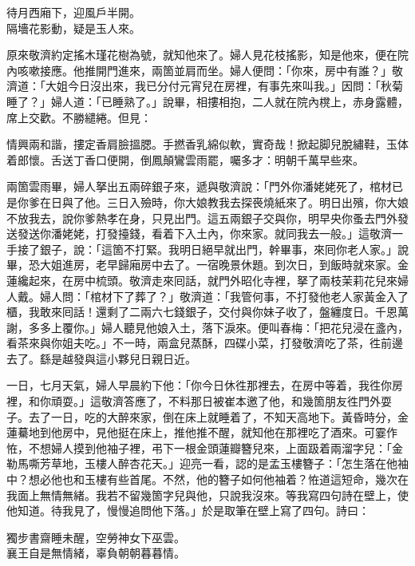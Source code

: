 \begin{myquote}
待月西廂下，迎風戶半開。\\隔墻花影動，疑是玉人來。
\end{myquote}

原來敬濟約定搖木瑾花樹為號，就知他來了。婦人見花枝搖影，知是他來，便在院內咳嗽接應。他推開門進來，兩箇並肩而坐。婦人便問：「你來，房中有誰？」敬濟道：「大姐今日沒出來，我已分付元宵兒在房裡，有事先來叫我。」因問：「秋菊睡了？」婦人道：「已睡熟了。」說畢，相摟相抱，二人就在院內櫈上，赤身露體，席上交歡。不勝繾綣。但見：

\begin{myquote}
情興兩和諧，摟定香肩臉搵腮。手撚香乳綿似軟，實奇哉！掀起脚兒脫繡鞋，玉体着郎懷。舌送丁香口便開，倒鳳顛鸞雲雨罷，囑多才：明朝千萬早些來。
\end{myquote}

兩箇雲雨畢，婦人拏出五兩碎銀子來，遞與敬濟說：「門外你潘姥姥死了，棺材已是你爹在日與了他。三日入殮時，你大娘教我去探䘮燒紙來了。明日出殯，你大娘不放我去，說你爹熱孝在身，只見出門。這五兩銀子交與你，明早央你蚤去門外發送發送你潘姥姥，打發擡錢，看着下入土內，你來家。就同我去一般。」{}這敬濟一手接了銀子，說：「這箇不打緊。我明日絕早就出門，幹畢事，來囘你老人家。」說畢，恐大姐進房，老早歸廂房中去了。一宿晚景休題。到次日，到飯時就來家。金蓮纔起來，在房中梳頭。敬濟走來囘話，就門外昭化寺裡，拏了兩枝茉莉花兒來婦人戴。婦人問：「棺材下了葬了？」敬濟道：「我管何事，不打發他老人家黃金入了櫃，我敢來囘話！還剩了二兩六七錢銀子，交付與你妹子收了，盤纏度日。千恩萬謝，多多上覆你。」婦人聽見他娘入土，落下淚來。{}便叫春梅：「把花兒浸在盞內，看茶來與你姐夫吃。」不一時，兩盒兒蒸酥，四碟小菜，打發敬濟吃了茶，徃前邊去了。繇是越發與這小夥兒日親日近。

一日，七月天氣，婦人早晨約下他：「你今日休徃那裡去，在房中等着，我徃你房裡，和你頑耍。」這敬濟答應了，不料那日被崔本邀了他，和幾箇朋友徃門外耍子。去了一日，吃的大醉來家，倒在床上就睡着了，不知天高地下。黃昏時分，金蓮驀地到他房中，見他挺在床上，推他推不醒，就知他在那裡吃了酒來。可霎作恠，不想婦人摸到他袖子裡，弔下一根金頭蓮瓣簪兒來，上面趿着兩溜字兒：「金勒馬嘶芳草地，玉樓人醉杏花天。」{}迎亮一看，認的是孟玉樓簪子：「怎生落在他袖中？想必他也和玉樓有些首尾。不然，他的簪子如何他袖着？恠道這短命，幾次在我面上無情無緒。我若不留幾箇字兒與他，只說我沒來。等我寫四句詩在壁上，使他知道。待我見了，慢慢追問他下落。」於是取筆在壁上寫了四句。詩曰：

\begin{myquote}
獨步書齋睡未醒，空勞神女下巫雲。\\襄王自是無情緒，辜負朝朝暮暮情。
\end{myquote}

